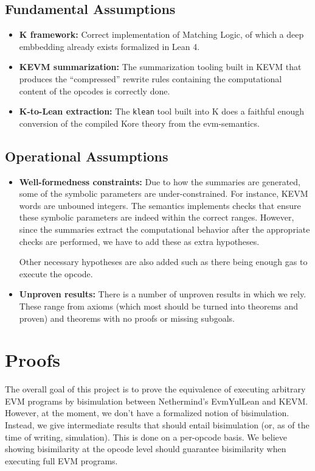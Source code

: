 \subsection{Fundamental Assumptions}

\begin{itemize}
\item \textbf{K framework:} Correct implementation of Matching Logic, of which a deep embbedding already exists formalized in Lean 4.
\item \textbf{KEVM summarization:} The summarization tooling built in KEVM that produces the ``compressed'' rewrite rules containing the computational content of the opcodes is correctly done.
\item \textbf{K-to-Lean extraction:} The \texttt{klean} tool built into K does a faithful enough conversion of the compiled Kore theory from the evm-semantics.
\end{itemize}

\subsection{Operational Assumptions}

\begin{itemize}
\item \textbf{Well-formedness constraints:} Due to how the summaries are generated, some of the symbolic parameters are under-constrained. For instance, KEVM words are unbouned integers.
  The semantics implements checks that ensure these symbolic parameters are indeed within the correct ranges. However, since the summaries extract the computational behavior after the appropriate checks are performed, we have to add these as extra hypotheses.

  Other necessary hypotheses are also added such as there being enough gas to execute the opcode.
\item \textbf{Unproven results:} There is a number of unproven results in which we rely. These range from axioms (which most should be turned into theorems and proven) and theorems with no proofs or missing subgoals.
\end{itemize}

\section{Proofs}

The overall goal of this project is to prove the equivalence of executing arbitrary EVM programs by bisimulation between Nethermind's EvmYulLean and KEVM.
However, at the moment, we don't have a formalized notion of bisimulation.
Instead, we give intermediate results that should entail bisimulation (or, as of the time of writing, simulation).
This is done on a per-opcode basis. We believe showing bisimilarity at the opcode level should guarantee bisimilarity when executing full EVM programs.

